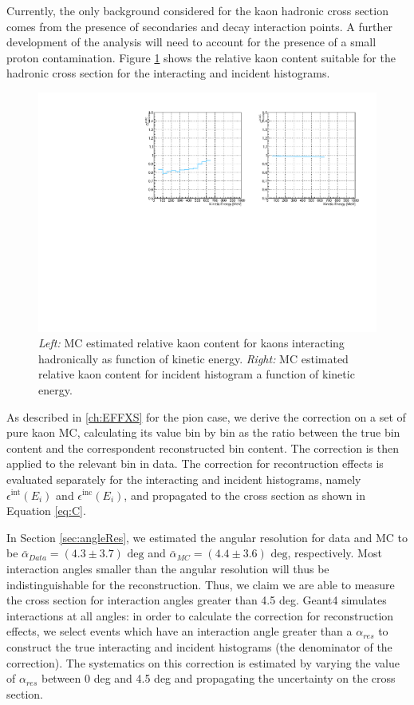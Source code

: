 Currently, the only background considered for the kaon hadronic cross section comes from the presence of secondaries and decay interaction points. A further development of the analysis will need to account for the presence of a small proton contamination. Figure \ref{fig:CorrectionsBeamK} shows the relative kaon content suitable for the hadronic cross section for the interacting and incident histograms. 
\begin{figure}[p]
\centering
\includegraphics[width=\textwidth]{Chapter-7/Images/KaonBkgSub_WithDK.pdf}
\caption{\emph{Left:} MC estimated relative kaon content for kaons interacting hadronically as function of kinetic energy. \emph{Right:}  MC estimated relative kaon content  for incident histogram a function of kinetic energy.}
\label{fig:CorrectionsBeamK}
\end{figure}


As described in \ref{ch:EFFXS} for the pion case, we derive the correction on a set of pure kaon MC, calculating its value bin by bin as the ratio between the true bin content and the correspondent reconstructed bin content. The correction is then applied to the relevant bin in data. 
The correction for recontruction effects is evaluated separately for the interacting and incident histograms, namely $\epsilon^{\text{int}}(E_i)$ and  $\epsilon^{\text{inc}}(E_i)$, and propagated to the cross section as shown in  Equation \ref{eq:C}. 


In Section \ref{sec:angleRes}, we estimated the angular resolution for data and MC to be $\bar\alpha_{Data} = (4.3 \pm 3.7) \text{ deg}$  and  $\bar\alpha_{MC} = (4.4 \pm 3.6) \text{ deg}$, respectively.  Most interaction angles smaller than the angular resolution will thus be indistinguishable  for the reconstruction. Thus, we claim we are able to  measure the cross section for interaction angles greater than 4.5 deg. Geant4 simulates interactions at all angles: in order to calculate the correction for reconstruction effects,  we select events which have an interaction angle greater than a $\alpha_{res}$ to construct the true interacting and incident histograms (the denominator of the correction). The systematics on this correction is estimated by varying the value of $\alpha_{res}$ between 0 deg and 4.5 deg and propagating the uncertainty on the cross section. 

